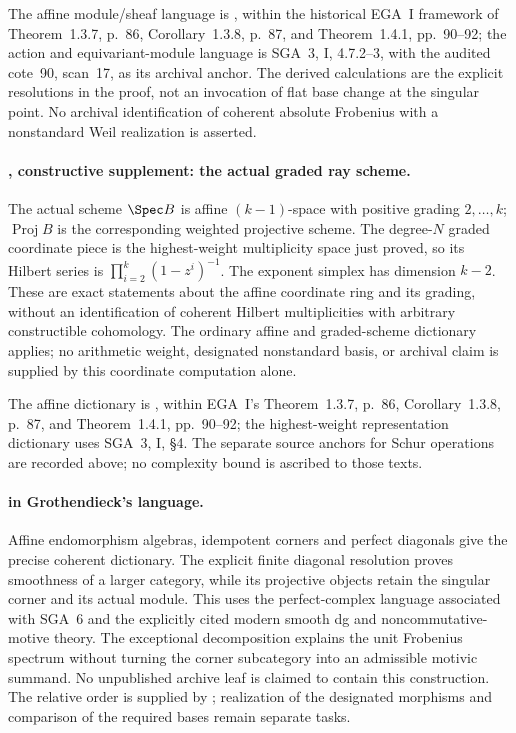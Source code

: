 The affine module/sheaf language is
\cite[Lemma~26.7.5, tag~01IB]{StacksAffine}, within the
historical EGA~I framework of Theorem~1.3.7, p.~86,
Corollary~1.3.8, p.~87, and Theorem~1.4.1, pp.~90--92; the action and
equivariant-module language is SGA~3, I, 4.7.2--3, with the audited
cote~90, scan~17, as its archival anchor. The derived calculations
are the explicit resolutions in the proof, not an invocation of
flat base change at the singular point. No archival identification
of coherent absolute Frobenius with a nonstandard Weil realization
is asserted.


\paragraph{, constructive supplement: the actual graded ray scheme.}
The actual scheme $\Spec B$ is affine $(k-1)$-space with positive
grading $2,\ldots,k$; $\operatorname{Proj}B$ is the corresponding
weighted projective scheme. The degree-$N$ graded coordinate piece
is the highest-weight multiplicity space just proved, so its Hilbert
series is $\prod_{i=2}^k(1-z^i)^{-1}$. The exponent simplex has
dimension $k-2$. These are exact statements about the affine
coordinate ring and its grading, without an identification of
coherent Hilbert multiplicities with arbitrary constructible
cohomology. The ordinary affine and graded-scheme dictionary applies;
no arithmetic weight, designated nonstandard basis, or archival
claim is supplied by this coordinate computation alone.

The affine dictionary is \cite[Lemma~26.7.5, tag~01IB]{StacksAffine},
within EGA~I's Theorem~1.3.7, p.~86, Corollary~1.3.8,
p.~87, and Theorem~1.4.1, pp.~90--92; the highest-weight
representation dictionary uses SGA~3, I, \S4. The separate source anchors for Schur operations are recorded above; no complexity bound is ascribed to those texts.


\paragraph{ in Grothendieck's language.}
Affine endomorphism algebras, idempotent corners and perfect
diagonals give the precise coherent dictionary. The explicit
finite diagonal resolution proves smoothness of a larger category,
while its projective objects retain the singular corner and its
actual module. This uses the perfect-complex language associated
with SGA~6 and the explicitly cited modern smooth dg and
noncommutative-motive theory. The exceptional decomposition
explains the unit Frobenius spectrum without turning the corner
subcategory into an admissible motivic summand. No unpublished
archive leaf is claimed to contain this construction. The relative
order is supplied by ; realization of the designated
morphisms and comparison of the required bases remain separate tasks.

